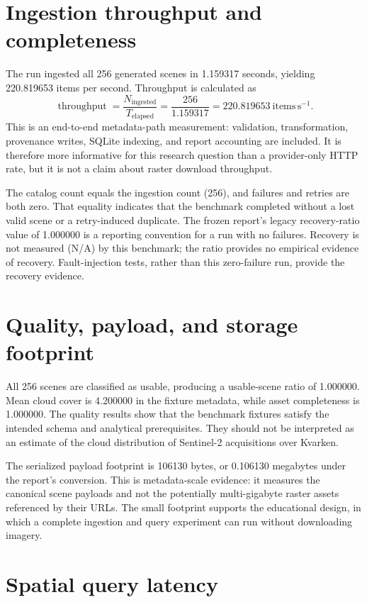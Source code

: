 \section{Ingestion throughput and completeness}

The run ingested all 256 generated scenes in 1.159317 seconds, yielding 220.819653 items per
second. Throughput is calculated as
\[
\operatorname{throughput}=\frac{N_{\mathrm{ingested}}}{T_{\mathrm{elapsed}}}
=\frac{256}{1.159317}=220.819653\ \mathrm{items\,s^{-1}}.
\]
This is an end-to-end metadata-path measurement: validation, transformation, provenance writes,
SQLite indexing, and report accounting are included. It is therefore more informative for this
research question than a provider-only HTTP rate, but it is not a claim about raster download
throughput.

The catalog count equals the ingestion count (256), and failures and retries are both zero.
That equality indicates that the benchmark completed without a lost valid scene or a retry-induced
duplicate. The frozen report's legacy recovery-ratio value of 1.000000 is a reporting convention
for a run with no failures. Recovery is not measured (N/A) by this benchmark; the ratio provides
no empirical evidence of recovery. Fault-injection tests, rather than this zero-failure run,
provide the recovery evidence.

\section{Quality, payload, and storage footprint}

All 256 scenes are classified as usable, producing a usable-scene ratio of 1.000000. Mean cloud
cover is 4.200000 in the fixture metadata, while asset completeness is 1.000000. The quality
results show that the benchmark fixtures satisfy the intended schema and analytical prerequisites.
They should not be interpreted as an estimate of the cloud distribution of Sentinel-2 acquisitions
over Kvarken.

The serialized payload footprint is 106130 bytes, or 0.106130 megabytes under the report's
conversion. This is metadata-scale evidence: it measures the canonical scene payloads and not
the potentially multi-gigabyte raster assets referenced by their URLs. The small footprint
supports the educational design, in which a complete ingestion and query experiment can run
without downloading imagery.

\section{Spatial query latency}

